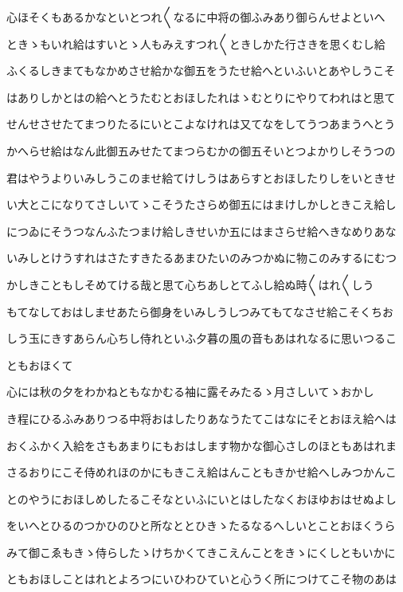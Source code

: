 \documentclass[a4paper,11pt,landscape]{ltjtarticle}
\begin{document}
\par\medskip
心ほそくもあるかなといとつれ〱なるに中将の御ふみあり御らんせよといへ
\par\medskip
ときゝもいれ給はすいとゝ人もみえすつれ〱ときしかた行さきを思くむし給
\par\medskip
ふくるしきまてもなかめさせ給かな御五をうたせ給へといふいとあやしうこそ
\par\medskip
はありしかとはの給へとうたむとおほしたれはゝむとりにやりてわれはと思て
\par\medskip
せんせさせたてまつりたるにいとこよなけれは又てなをしてうつあまうへとう
\par\medskip
かへらせ給はなん此御五みせたてまつらむかの御五そいとつよかりしそうつの
\par\medskip
君はやうよりいみしうこのませ給てけしうはあらすとおほしたりしをいときせ
\par\medskip
い大とこになりてさしいてゝこそうたさらめ御五にはまけしかしときこえ給し
\par\medskip
につゐにそうつなんふたつまけ給しきせいか五にはまさらせ給へきなめりあな
\par\medskip
いみしとけうすれはさたすきたるあまひたいのみつかぬに物このみするにむつ
\par\medskip
かしきこともしそめてける哉と思て心ちあしとてふし給ぬ時〱はれ〱しう
\par\medskip
もてなしておはしませあたら御身をいみしうしつみてもてなさせ給こそくちお
\par\medskip
しう玉にきすあらん心ちし侍れといふ夕暮の風の音もあはれなるに思いつるこ
\par\medskip
ともおほくて
\par\medskip
心には秋の夕をわかねともなかむる袖に露そみたるゝ月さしいてゝおかし
\par\medskip
き程にひるふみありつる中将おはしたりあなうたてこはなにそとおほえ給へは
\par\medskip
おくふかく入給をさもあまりにもおはします物かな御心さしのほともあはれま
\par\medskip
さるおりにこそ侍めれほのかにもきこえ給はんこともきかせ給へしみつかんこ
\par\medskip
とのやうにおほしめしたるこそなといふにいとはしたなくおほゆおはせぬよし
\par\medskip
をいへとひるのつかひのひと所なととひきゝたるなるへしいとことおほくうら
\par\medskip
みて御こゑもきゝ侍らしたゝけちかくてきこえんことをきゝにくしともいかに
\par\medskip
ともおほしことはれとよろつにいひわひていと心うく所につけてこそ物のあは
\end{document}
